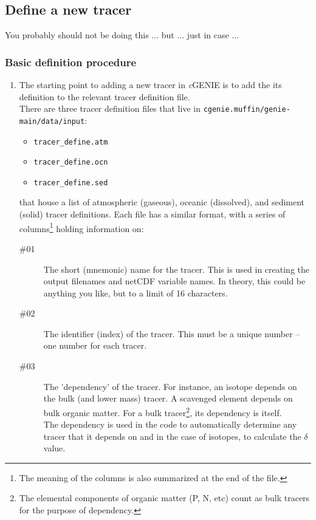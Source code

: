 \documentclass[11pt,fleqn]{book} %
\begin{document}
%
\subsection*{Define a new tracer}\label{Define a new trace}

You probably should not be doing this ... but ... just in case ...

%
\subsubsection{Basic definition procedure}

\begin{enumerate}
\item
The starting point to adding a new tracer in \textit{c}GENIE is to add the its definition to the relevant tracer definition file.
\\There are three tracer definition files that live in \texttt{cgenie.muffin/genie-main/data/input}:
\begin{itemize}
\item \texttt{tracer\_define.atm}
\item \texttt{tracer\_define.ocn}
\item \texttt{tracer\_define.sed}
\end{itemize}
that house a list of atmospheric (gaseous), oceanic (dissolved), and sediment (solid) tracer definitions.
Each file has a similar format, with a series of columns\footnote{The meaning of the columns is also summarized at the end of the file.} holding information on:
\begin{description}
\item[\#01] The short (mnemonic) name for the tracer. This is used in creating the output filenames and netCDF variable names. In theory, this could be anything you like, but to a limit of 16 characters.
\item[\#02] The identifier (index) of the tracer. This must be a unique number -- one number for each tracer.
\item[\#03] The 'dependency' of the tracer. For instance, an isotope depends on the bulk (and lower mass) tracer. A scavenged element depends on bulk organic matter. For a bulk tracer\footnote{The elemental components of organic matter (P, N, etc) count as bulk tracers for the purpose of dependency.}, its dependency is itself. \\The dependency is used in the code to automatically determine any tracer that it depends on and in the case of isotopes, to calculate the \(\delta\) value.

\end{description}
\end{enumerate}
\end{document}
